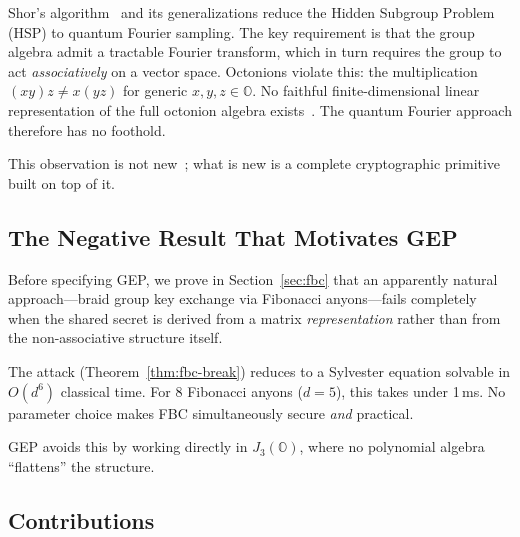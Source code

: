 \documentclass[11pt,letterpaper]{article}
\theoremstyle{definition}
\begin{document}
Shor's algorithm~\cite{shor1994} and its generalizations reduce the Hidden
Subgroup Problem (HSP) to quantum Fourier sampling.  The key requirement is
that the group algebra admit a tractable Fourier transform, which in turn
requires the group to act \emph{associatively} on a vector space.
Octonions violate this: the multiplication $(xy)z \neq x(yz)$ for generic
$x,y,z \in \mathbb{O}$.  No faithful finite-dimensional linear representation
of the full octonion algebra exists~\cite{conway_smith2003}.  The quantum
Fourier approach therefore has no foothold.

This observation is not new~\cite{childs2010}; what is new is a complete
cryptographic primitive built on top of it.

\subsection{The Negative Result That Motivates GEP}

Before specifying GEP, we prove in Section~\ref{sec:fbc} that an apparently
natural approach---braid group key exchange via Fibonacci anyons---fails
completely when the shared secret is derived from a matrix
\emph{representation} rather than from the non-associative structure itself.

The attack (Theorem~\ref{thm:fbc-break}) reduces to a Sylvester equation
solvable in $O(d^6)$ classical time. For 8 Fibonacci anyons ($d=5$), this
takes under 1\,ms.  No parameter choice makes FBC simultaneously secure
\emph{and} practical.

GEP avoids this by working directly in $J_3(\mathbb{O})$, where no polynomial
algebra ``flattens'' the structure.

\subsection{Contributions}
\end{document}
